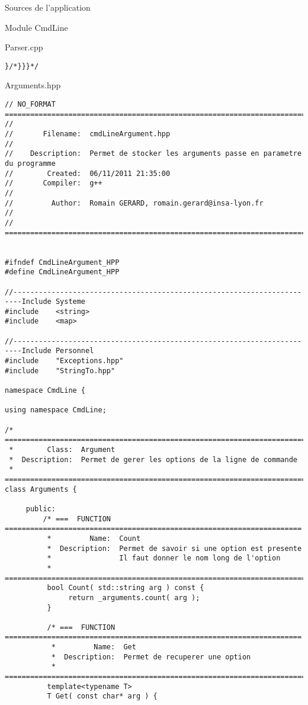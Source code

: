 \documentclass{article}
\begin{document}
\begin{section}{Sources de l'application}
\begin{subsection}{Module CmdLine}
\begin{paragraph}{Parser.cpp}
\begin{verbatim}
}/*}}}*/
      \end{verbatim}
      \end{paragraph}

  \newpage
  \begin{paragraph}{Arguments.hpp}
   \begin{verbatim}
// NO_FORMAT ============================================================================
//
//       Filename:  cmdLineArgument.hpp
//
//    Description:  Permet de stocker les arguments passe en parametre du programme
//        Created:  06/11/2011 21:35:00
//       Compiler:  g++
//
//         Author:  Romain GERARD, romain.gerard@insa-lyon.fr
//
// =====================================================================================


#ifndef CmdLineArgument_HPP
#define CmdLineArgument_HPP

//------------------------------------------------------------------------Include Systeme
#include    <string>
#include    <map>

//------------------------------------------------------------------------Include Personnel
#include    "Exceptions.hpp"
#include    "StringTo.hpp"

namespace CmdLine {

using namespace CmdLine;

/* =====================================================================================
 *        Class:  Argument
 *  Description:  Permet de gerer les options de la ligne de commande
 * =====================================================================================*/
class Arguments {

     public:
         /* ===  FUNCTION  ======================================================================
          *         Name:  Count
          *  Description:  Permet de savoir si une option est presente
          *                Il faut donner le nom long de l'option
          * =====================================================================================*/
          bool Count( std::string arg ) const {
               return _arguments.count( arg );
          }

          /* ===  FUNCTION  ======================================================================
           *         Name:  Get
           *  Description:  Permet de recuperer une option 
           * =====================================================================================*/
          template<typename T>
          T Get( const char* arg ) {


\end{verbatim}
\end{paragraph}
\end{subsection}
\end{section}
\end{document}
